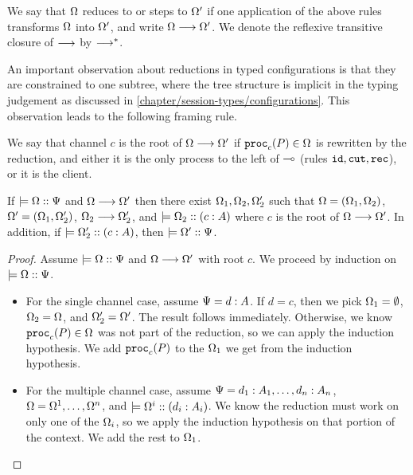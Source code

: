 We say that $\Omega$ reduces to or steps to $\Omega'$ if one application of the above rules transforms $\Omega$ into $\Omega'$, and write $\Omega \longrightarrow \Omega'$. We denote the reflexive transitive closure of $\longrightarrow$ by $\longrightarrow^*$.

An important observation about reductions in typed configurations is that they are constrained to one subtree, where the tree structure is implicit in the typing judgement as discussed in \cref{chapter/session-types/configurations}. This observation leads to the following framing rule.

\begin{definition} We say that channel $c$ is the root of $\Omega \longrightarrow \Omega'$ if $\mathtt{proc}_{c}(P) \in \Omega$ is rewritten by the reduction, and either it is the only process to the left of $\multimap$ (rules $\texttt{id}, \texttt{cut}, \texttt{rec}$), or it is the client.
\end{definition}

\begin{lemma}[Framing]
  \label{framing}
  If $\models {\Omega} :: {\Psi}$ and $\Omega \longrightarrow \Omega'$ then there exist $\Omega_1, \Omega_2, \Omega_2'$ such that $\Omega = (\Omega_1, \Omega_2)$, $\Omega' = (\Omega_1, \Omega_2')$, $\Omega_2 \longrightarrow \Omega_2'$, and $\models {\Omega_2} :: ({c} : {A})$ where $c$ is the root of $\Omega \longrightarrow \Omega'$. In addition, if $\models {\Omega_2'} :: ({c} : {A})$, then $\models {\Omega'} :: {\Psi}$.
\end{lemma}

\begin{proof}
  Assume $\models {\Omega} :: {\Psi}$ and $\Omega \longrightarrow \Omega'$ with root $c$. We proceed by induction on $\models {\Omega} :: {\Psi}$.
  \begin{itemize}
    \item For the single channel case, assume $\Psi = d : A$. If $d = c$, then we pick $\Omega_1 = \emptyset$, $\Omega_2 = \Omega$, and $\Omega_2' = \Omega'$. The result follows immediately. Otherwise, we know $\mathtt{proc}_{c}(P) \in \Omega$ was not part of the reduction, so we can apply the induction hypothesis. We add $\mathtt{proc}_{c}(P)$ to the $\Omega_1$ we get from the induction hypothesis.
    \item For the multiple channel case, assume $\Psi = d_1 : A_1, \ldots, d_n : A_n$, $\Omega = \Omega^1, \ldots, \Omega^n$, and $\models {\Omega^i} :: ({d_i} : {A_i})$. We know the reduction must work on only one of the $\Omega_i$, so we apply the induction hypothesis on that portion of the context. We add the rest to $\Omega_1$.
  \end{itemize}
\end{proof}


